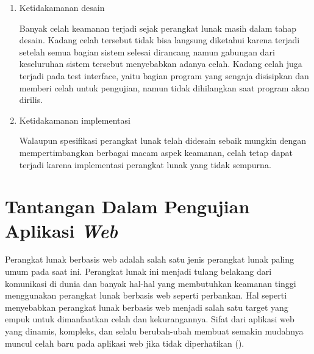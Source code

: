 \begin{enumerate}
  \item Ketidakamanan desain

        Banyak celah keamanan terjadi sejak perangkat lunak masih dalam tahap desain.
        Kadang celah tersebut tidak bisa langsung diketahui karena terjadi setelah semua
        bagian sistem selesai dirancang namun gabungan dari keseluruhan sistem tersebut
        menyebabkan adanya celah.
        Kadang celah juga terjadi pada test interface, yaitu bagian program yang sengaja
        disisipkan dan memberi celah untuk pengujian, namun tidak dihilangkan saat program akan dirilis.

  \item Ketidakamanan implementasi

        Walaupun spesifikasi perangkat lunak telah didesain sebaik mungkin dengan
        mempertimbangkan berbagai macam aspek keamanan,
        celah tetap dapat terjadi karena implementasi perangkat lunak yang tidak sempurna.

\end{enumerate}

\section{Tantangan Dalam Pengujian Aplikasi \emph{Web}}

Perangkat lunak berbasis web adalah salah satu jenis perangkat lunak paling umum pada saat ini.
Perangkat lunak ini menjadi tulang belakang dari komunikasi di dunia dan banyak hal-hal
yang membutuhkan keamanan tinggi menggunakan perangkat lunak berbasis web seperti perbankan.
Hal seperti menyebabkan perangkat lunak berbasis web menjadi salah satu target yang empuk untuk
dimanfaatkan celah dan kekurangannya. Sifat dari aplikasi web yang dinamis, kompleks, dan
selalu berubah-ubah membuat semakin mudahnya muncul celah baru
pada aplikasi web jika tidak diperhatikan (\cite{websecchal}).

